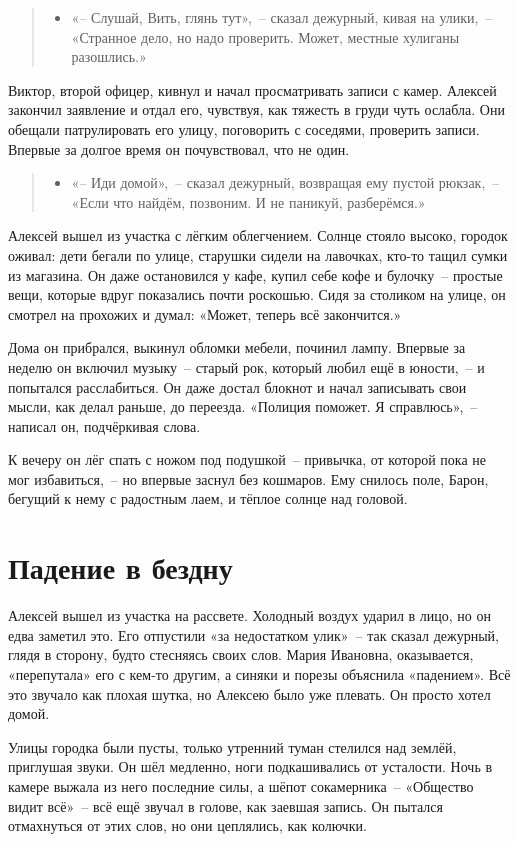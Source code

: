 \documentclass[12pt,a4paper]{book}
\newenvironment{dialogue}{\begin{quote}\itshape\begin{itemize}\item[]}{\end{itemize}\end{quote}}
\begin{document}
\begin{dialogue}
«-- Слушай, Вить, глянь тут»,~-- сказал дежурный, кивая на улики,~-- «Странное дело, но надо проверить. Может, местные хулиганы разошлись.»
\end{dialogue}

Виктор, второй офицер, кивнул и начал просматривать записи с камер. Алексей закончил заявление и отдал его, чувствуя, как тяжесть в груди чуть ослабла. Они обещали патрулировать его улицу, поговорить с соседями, проверить записи. Впервые за долгое время он почувствовал, что не один.

\begin{dialogue}
«-- Иди домой»,~-- сказал дежурный, возвращая ему пустой рюкзак,~-- «Если что найдём, позвоним. И не паникуй, разберёмся.»
\end{dialogue}

Алексей вышел из участка с лёгким облегчением. Солнце стояло высоко, городок оживал: дети бегали по улице, старушки сидели на лавочках, кто-то тащил сумки из магазина. Он даже остановился у кафе, купил себе кофе и булочку~-- простые вещи, которые вдруг показались почти роскошью. Сидя за столиком на улице, он смотрел на прохожих и думал: «Может, теперь всё закончится.»

Дома он прибрался, выкинул обломки мебели, починил лампу. Впервые за неделю он включил музыку~-- старый рок, который любил ещё в юности,~-- и попытался расслабиться. Он даже достал блокнот и начал записывать свои мысли, как делал раньше, до переезда. «Полиция поможет. Я справлюсь»,~-- написал он, подчёркивая слова.

К вечеру он лёг спать с ножом под подушкой~-- привычка, от которой пока не мог избавиться,~-- но впервые заснул без кошмаров. Ему снилось поле, Барон, бегущий к нему с радостным лаем, и тёплое солнце над головой.

\chapter{Падение в бездну}

Алексей вышел из участка на рассвете. Холодный воздух ударил в лицо, но он едва заметил это. Его отпустили «за недостатком улик»~-- так сказал дежурный, глядя в сторону, будто стесняясь своих слов. Мария Ивановна, оказывается, «перепутала» его с кем-то другим, а синяки и порезы объяснила «падением». Всё это звучало как плохая шутка, но Алексею было уже плевать. Он просто хотел домой.

Улицы городка были пусты, только утренний туман стелился над землёй, приглушая звуки. Он шёл медленно, ноги подкашивались от усталости. Ночь в камере выжала из него последние силы, а шёпот сокамерника~-- «Общество видит всё»~-- всё ещё звучал в голове, как заевшая запись. Он пытался отмахнуться от этих слов, но они цеплялись, как колючки.
\end{document}
